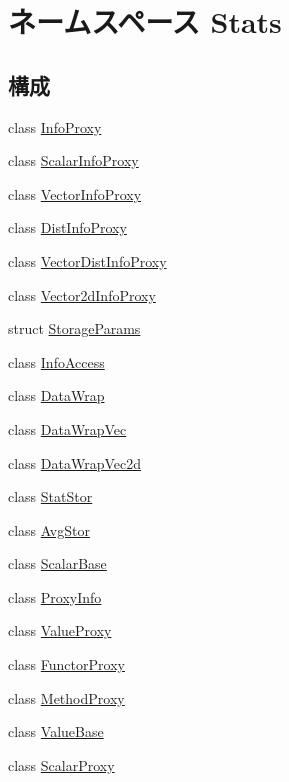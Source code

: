 \hypertarget{namespaceStats}{
\section{ネームスペース Stats}
\label{namespaceStats}
}
\subsection*{構成}
\begin{DoxyCompactItemize}
\item 
class \hyperlink{classStats_1_1InfoProxy}{InfoProxy}
\item 
class \hyperlink{classStats_1_1ScalarInfoProxy}{ScalarInfoProxy}
\item 
class \hyperlink{classStats_1_1VectorInfoProxy}{VectorInfoProxy}
\item 
class \hyperlink{classStats_1_1DistInfoProxy}{DistInfoProxy}
\item 
class \hyperlink{classStats_1_1VectorDistInfoProxy}{VectorDistInfoProxy}
\item 
class \hyperlink{classStats_1_1Vector2dInfoProxy}{Vector2dInfoProxy}
\item 
struct \hyperlink{structStats_1_1StorageParams}{StorageParams}
\item 
class \hyperlink{classStats_1_1InfoAccess}{InfoAccess}
\item 
class \hyperlink{classStats_1_1DataWrap}{DataWrap}
\item 
class \hyperlink{classStats_1_1DataWrapVec}{DataWrapVec}
\item 
class \hyperlink{classStats_1_1DataWrapVec2d}{DataWrapVec2d}
\item 
class \hyperlink{classStats_1_1StatStor}{StatStor}
\item 
class \hyperlink{classStats_1_1AvgStor}{AvgStor}
\item 
class \hyperlink{classStats_1_1ScalarBase}{ScalarBase}
\item 
class \hyperlink{classStats_1_1ProxyInfo}{ProxyInfo}
\item 
class \hyperlink{classStats_1_1ValueProxy}{ValueProxy}
\item 
class \hyperlink{classStats_1_1FunctorProxy}{FunctorProxy}
\item 
class \hyperlink{classStats_1_1MethodProxy}{MethodProxy}
\item 
class \hyperlink{classStats_1_1ValueBase}{ValueBase}
\item 
class \hyperlink{classStats_1_1ScalarProxy}{ScalarProxy}

\end{DoxyCompactItemize}
